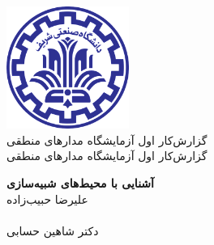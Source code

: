 \begin{titlepage}

\center %



\includegraphics[width=0.3\textwidth]{title/logo.png}\\[1cm] 
\ifdefined\school
\Large \textsc{گزارش‌کار اول آزمایشگاه مدارهای منطقی} \\[1.5cm] %
\ifdefined\department
\large گزارش‌کار اول آزمایشگاه مدارهای منطقی\\[1.5cm] %
\fi

\makeatletter
\textsc{{ \huge \bfseries آشنایی با محیط‌های شبیه‌سازی}}\\[cm] %
 


\ifdefined\authorid
علیرضا حبیب‌زاده\\ %
\authorid\\[2cm] %
\else
\textsc{
دکتر شاهین حسابی
}\\[2cm]
\fi



\end{titlepage}
